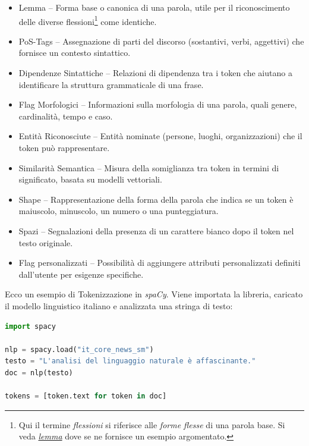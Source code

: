 \documentclass[12pt]{report}
\newcommand{\spacy}{\textsl{spaCy}\xspace}
\begin{document}
\begin{itemize}
\item \textsf{Lemma} -- Forma base o canonica di una parola, utile per il riconoscimento delle diverse flessioni\footnote{Qui il termine \textit{flessioni} si riferisce alle \textit{forme flesse} di una parola base. Si veda \hyperref[fn:lemma]{\itshape lemma} dove se ne fornisce un esempio argomentato.} come identiche.
\item \textsf{PoS-Tags} -- Assegnazione di parti del discorso (sostantivi, verbi, aggettivi) che fornisce un contesto sintattico.
\item \textsf{Dipendenze Sintattiche} -- Relazioni di dipendenza tra i token che aiutano a identificare la struttura grammaticale di una frase.
\item \textsf{Flag Morfologici} -- Informazioni sulla morfologia di una parola, quali genere, cardinalità, tempo e caso.
\item \textsf{Entità Riconosciute} -- Entità nominate (persone, luoghi, organizzazioni) che il token può rappresentare.
\item \textsf{Similarità Semantica} -- Misura della somiglianza tra token in termini di significato, basata su modelli vettoriali.
\item \textsf{Shape} -- Rappresentazione della forma della parola che indica se un token è maiuscolo, minuscolo, un numero o una punteggiatura.
\item \textsf{Spazi} -- Segnalazioni della presenza di un carattere bianco dopo il token nel testo originale.
\item \textsf{Flag personalizzati} -- Possibilità di aggiungere attributi personalizzati definiti dall'utente per esigenze specifiche.
\end{itemize}


\begin{mdframed}
\small
Ecco un esempio di Tokenizzazione in \spacy. Viene importata la libreria, caricato il modello linguistico italiano e analizzata una stringa di testo:

\begin{lstlisting}[language=Python]
import spacy

nlp = spacy.load("it_core_news_sm")
testo = "L'analisi del linguaggio naturale è affascinante."
doc = nlp(testo)

tokens = [token.text for token in doc]
\end{lstlisting}
\end{mdframed}
\end{document}
